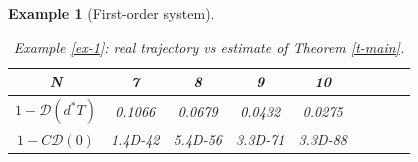 \documentclass[journal]{article}
\newtheorem{example}{Example}
\newcommand{\D}{\mathcal{D}}
\begin{document}
\begin{example}[First-order system]
\begin{table}[htb]
\begin{centering}
\vspace{2mm}

\begin{tabular}{|c||c|c|c|c|c|c|c|c|}\hline
N &7&8&9&10\\\hline
$1-\D(d^*T)$ &   0.1066&   0.0679 &   0.0432 &  0.0275\\\hline
$1-C\D(0)$ &1.4D-42 &  5.4D-56 & 3.3D-71&  3.3D-88\\\hline
\end{tabular}

\end{centering}

\vspace{2mm}

\caption{Example \ref{ex-1}: real trajectory vs estimate of Theorem \ref{t-main}.}
\label{t-dim1}
\end{table}


\end{example}
\end{document}
